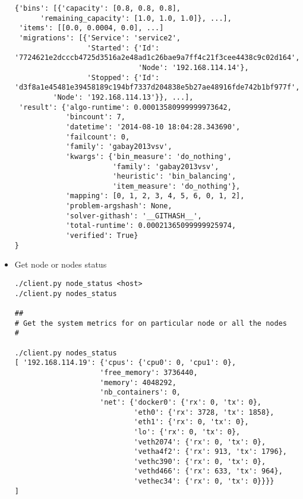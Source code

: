 \begin{itemize}
{\begin{lstlisting}
{'bins': [{'capacity': [0.8, 0.8, 0.8],
	  'remaining_capacity': [1.0, 1.0, 1.0]}, ...],
 'items': [[0.0, 0.0004, 0.0], ...]
 'migrations': [{'Service': 'service2',
                 'Started': {'Id': '7724621e2dcccb4725d3516a2e48ad1c26bae9a7ff4c21f3cee4438c9c02d164',
                             'Node': '192.168.114.14'},
                 'Stopped': {'Id': 'd3f8a1e45481e39458189c194bf7337d204838e5b27ae48916fde742b1bf977f',
		 'Node': '192.168.114.13'}}, ...],
 'result': {'algo-runtime': 0.00013580999999973642,
            'bincount': 7,
            'datetime': '2014-08-10 18:04:28.343690',
            'failcount': 0,
            'family': 'gabay2013vsv',
            'kwargs': {'bin_measure': 'do_nothing',
                       'family': 'gabay2013vsv',
                       'heuristic': 'bin_balancing',
                       'item_measure': 'do_nothing'},
            'mapping': [0, 1, 2, 3, 4, 5, 6, 0, 1, 2],
            'problem-argshash': None,
            'solver-githash': '__GITHASH__',
            'total-runtime': 0.00021365099999925974,
            'verified': True}
}

\end{lstlisting}
}
\item{Get node or nodes status
\begin{lstlisting}
./client.py node_status <host>
./client.py nodes_status

##
# Get the system metrics for on particular node or all the nodes
#

./client.py nodes_status
[ '192.168.114.19': {'cpus': {'cpu0': 0, 'cpu1': 0},
                    'free_memory': 3736440,
                    'memory': 4048292,
                    'nb_containers': 0,
                    'net': {'docker0': {'rx': 0, 'tx': 0},
                            'eth0': {'rx': 3728, 'tx': 1858},
                            'eth1': {'rx': 0, 'tx': 0},
                            'lo': {'rx': 0, 'tx': 0},
                            'veth2074': {'rx': 0, 'tx': 0},
                            'vetha4f2': {'rx': 913, 'tx': 1796},
                            'vethc390': {'rx': 0, 'tx': 0},
                            'vethd466': {'rx': 633, 'tx': 964},
                            'vethec34': {'rx': 0, 'tx': 0}}}}
]
\end{lstlisting}}
\end{itemize}
